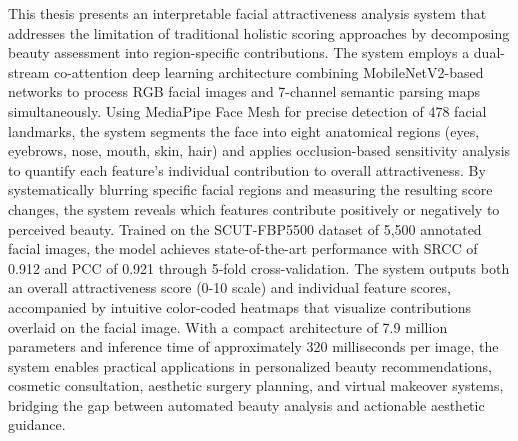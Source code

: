 This thesis presents an interpretable facial attractiveness analysis system that addresses the limitation of traditional holistic scoring approaches by decomposing beauty assessment into region-specific contributions. The system employs a dual-stream co-attention deep learning architecture combining MobileNetV2-based networks to process RGB facial images and 7-channel semantic parsing maps simultaneously. Using MediaPipe Face Mesh for precise detection of 478 facial landmarks, the system segments the face into eight anatomical regions (eyes, eyebrows, nose, mouth, skin, hair) and applies occlusion-based sensitivity analysis to quantify each feature's individual contribution to overall attractiveness. By systematically blurring specific facial regions and measuring the resulting score changes, the system reveals which features contribute positively or negatively to perceived beauty. Trained on the SCUT-FBP5500 dataset of 5,500 annotated facial images, the model achieves state-of-the-art performance with SRCC of 0.912 and PCC of 0.921 through 5-fold cross-validation. The system outputs both an overall attractiveness score (0-10 scale) and individual feature scores, accompanied by intuitive color-coded heatmaps that visualize contributions overlaid on the facial image. With a compact architecture of 7.9 million parameters and inference time of approximately 320 milliseconds per image, the system enables practical applications in personalized beauty recommendations, cosmetic consultation, aesthetic surgery planning, and virtual makeover systems, bridging the gap between automated beauty analysis and actionable aesthetic guidance.

